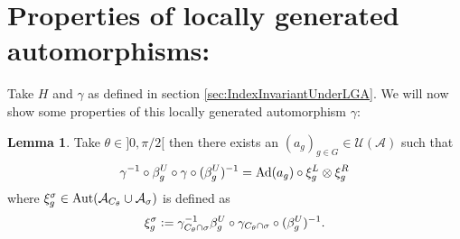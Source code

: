 \documentclass[12pt,a4paper,twoside]{article}
\newcommand{\defeq}{\vcentcolon=}
\let\originalleft\left
\let\originalright\right
\renewcommand{\left}{\mathopen{}\mathclose\bgroup\originalleft}
\renewcommand{\right}{\aftergroup\egroup\originalright}
\newcommand{\UU}{\mathcal U}
\renewcommand{\AA}{\mathcal A}
\newcommand{\Ad}[1]{\textrm{Ad}\left(#1\right)}
\newcommand{\Aut}[1]{\textrm{Aut}\left(#1\right)}
\theoremstyle{definition}
\newtheorem{lemma}[theorem]{Lemma}
\numberwithin{equation}{section}
\begin{document}
\section{Properties of locally generated automorphisms:}
 Take $H$ and $\gamma$ as defined in section \ref{sec:IndexInvariantUnderLGA}. We will now show some properties of this locally generated automorphism $\gamma$:
 \begin{lemma}\label{lem:GroupActionInCone}
 	Take $\theta\in]0,\pi/2[$ then there exists an $(a_g)_{g\in G}\in\UU(\AA)$ such that
 	\begin{equation}\label{eq:GroupActionInConeLemmaEquation1}
 	\gamma^{-1}\circ\beta_g^U\circ\gamma\circ(\beta_g^U)^{-1}=\Ad{a_g}\circ\xi^L_g\otimes\xi^R_g
 	\end{equation}
 	where  $\xi_{g}^{\sigma}\in\Aut{\AA_{C_{\theta}}\cup\AA_{\sigma}}$ is defined as
 	\begin{equation}
 	\xi_{g}^{\sigma}\defeq \gamma_{C_\theta\cap\sigma}^{-1}\beta_g^U\circ\gamma_{C_\theta\cap\sigma}\circ(\beta_g^U)^{-1}.
 	\end{equation}
 \end{lemma}
\end{document}
